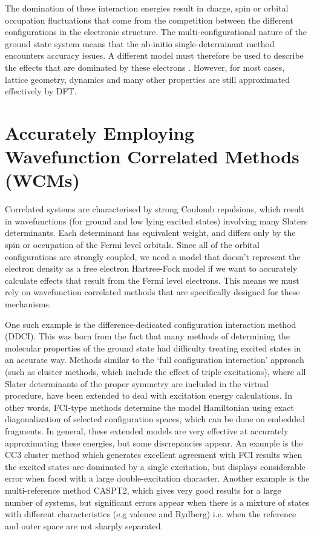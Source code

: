 \documentclass[10pt]{article}
\begin{document}
The domination of these interaction energies result in charge, spin or orbital occupation fluctuations that come from the competition between the different configurations in the electronic structure. The multi-configurational nature of the ground state system means that the ab-initio single-determinant method encounters accuracy issues. A different model must therefore be used to describe the effects that are dominated by these electrons \cite{gelle2009accurate}. However, for most cases, lattice geometry, dynamics and many other properties are still approximated effectively by DFT.

\section{Accurately Employing Wavefunction Correlated Methods (WCMs)}

Correlated systems are characterised by strong Coulomb repulsions, which result in wavefunctions (for ground and low lying excited states) involving many Slaters determinants. Each determinant has equivalent weight, and differs only by the spin or occupation of the Fermi level orbitals. Since all of the orbital configurations are strongly coupled, we need a model that doesn't represent the electron density as a free electron Hartree-Fock model if we want to accurately calculate effects that result from the Fermi level electrons. This means we must rely on wavefunction correlated methods that are specifically designed for these mechanisms. 

One such example is the difference-dedicated configuration interaction method (DDCI). This was born from the fact that many methods of determining the molecular properties of the ground state had difficulty treating excited states in an accurate way. Methods similar to the `full configuration interaction' approach (such as cluster methods, which include the effect of triple excitations), where all Slater determinants of the proper symmetry are included in the virtual procedure, have been extended to deal with excitation energy calculations. In other words, FCI-type methods determine the model Hamiltonian using exact diagonalization of selected configuration spaces, which can be done on embedded fragments. In general, these extended models are very effective at accurately approximating these energies, but some discrepancies appear. An example is the CC3 cluster method which generates excellent agreement with FCI results when the excited states are dominated by a single excitation, but displays considerable error when faced with a large double-excitation character. Another example is the multi-reference method CASPT2, which gives very good results for a large number of systems, but significant errors appear when there is a mixture of states with different characteristics (e.g valence and Rydberg) i.e. when the reference and outer space are not sharply separated.
\end{document}
